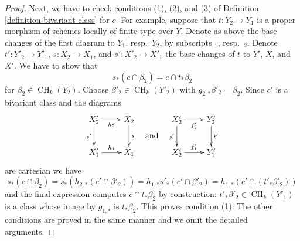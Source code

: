 \documentclass[10pt,a4paper]{amsart}
\theoremstyle{plain}
\theoremstyle{definition}
\theoremstyle{remark}
\numberwithin{equation}{subsection}
\def\CH{\mathop{\mathrm{CH}}\nolimits}
\begin{document}
\begin{proof}
\medskip\noindent
Next, we have to check conditions (1), (2), and (3) of
Definition \ref{definition-bivariant-class} for $c$.
For example, suppose that $t : Y_2 \to Y_1$ is a proper morphism
of schemes locally of finite type over $Y$. Denote as above
the base changes of the first diagram to $Y_1$, resp.\ $Y_2$,
by subscripts ${}_1$, resp.\ ${}_2$. Denote $t' : Y'_2 \to Y'_1$,
$s : X_2 \to X_1$, and $s' : X'_2 \to X'_1$ the base changes of $t$
to $Y'$, $X$, and $X'$. We have to show that
$$
s_*(c \cap \beta_2) = c \cap t_*\beta_2
$$
for $\beta_2 \in \CH_k(Y_2)$. Choose $\beta'_2 \in \CH_k(Y'_2)$
with $g_{2, *}\beta'_2 = \beta_2$. Since $c'$ is a bivariant class
and the diagrams
$$
\vcenter{
\xymatrix{
X'_2 \ar[d]_{s'} \ar[r]_{h_2} & X_2 \ar[d]^s \\
X'_1 \ar[r]^{h_1} & X_1
}
}
\quad\text{and}\quad
\vcenter{
\xymatrix{
X'_2 \ar[d]_{s'} \ar[r]_{f'_2} & Y'_2 \ar[d]^{t'} \\
X'_2 \ar[r]^{f'_1} & Y'_1
}
}
$$
are cartesian we have
$$
s_*(c \cap \beta_2) =
s_*(h_{2, *}(c' \cap \beta'_2)) =
h_{1, *}s'_*(c' \cap \beta'_2) =
h_{1, *}(c' \cap (t'_*\beta'_2))
$$
and the final expression computes $c \cap t_*\beta_2$ by construction:
$t'_*\beta'_2 \in \CH_k(Y'_1)$ is a class whose image by $g_{1, *}$ is
$t_*\beta_2$. This proves condition (1).
The other conditions are proved in the same manner
and we omit the detailed arguments.
\end{proof}
\end{document}
